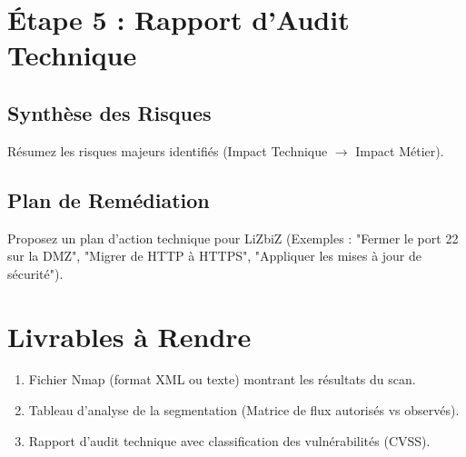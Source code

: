 \section{Étape 5 : Rapport d'Audit Technique}

\subsection{Synthèse des Risques}

Résumez les risques majeurs identifiés (Impact Technique $\rightarrow$ Impact Métier).

\subsection{Plan de Remédiation}

Proposez un plan d'action technique pour LiZbiZ (Exemples : "Fermer le port 22 sur la DMZ", "Migrer de HTTP à HTTPS", "Appliquer les mises à jour de sécurité").

\section{Livrables à Rendre}

\begin{enumerate}
    \item Fichier Nmap (format XML ou texte) montrant les résultats du scan.
    \item Tableau d'analyse de la segmentation (Matrice de flux autorisés vs observés).
    \item Rapport d'audit technique avec classification des vulnérabilités (CVSS).
\end{enumerate}

